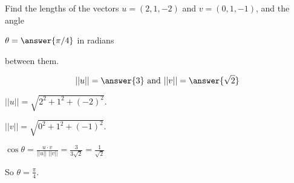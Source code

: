 \documentclass{ximera}
\begin{document}
\begin{exercise} \label{c1.4.3}
Find the lengths of the vectors $u=(2,1,-2)$ and $v=(0,1,-1)$,
and the angle \begin{prompt}$\theta = \answer{\pi/4}$ in radians\end{prompt} between them.
\begin{prompt}
  \[
    ||u|| = \answer{3} \mbox{ and } ||v|| = \answer{\sqrt{2}}
  \]
\end{prompt}
\begin{hint}
  $||u||  =  \sqrt{2^2 + 1^2 + (-2)^2}$.
\end{hint}
\begin{hint}
$||v||  =  \sqrt{0^2 + 1^2 + (-1)^2}$.
\end{hint}
\begin{hint}
$\cos \theta = \frac{u \cdot v}{||u||\;||v||}  =  \frac{3}{3\sqrt{2}} =
\frac{1}{\sqrt{2}}$
\end{hint}
\begin{hint}
So $\theta = \frac{\pi}{4}$.
\end{hint}
\end{exercise}
\end{document}
